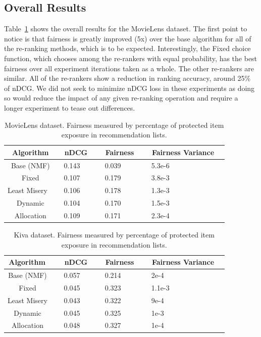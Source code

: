 \subsection{Overall Results}

Table~\ref{tab:overall-ML} shows the overall results for the MovieLens dataset. The first point to notice is that fairness is greatly improved (5x) over the base algorithm for all of the re-ranking methods, which is to be expected. Interestingly, the Fixed choice function, which chooses among the re-rankers with equal probability, has the best fairness over all experiment iterations taken as a whole. The other re-rankers are similar. All of the re-rankers show a reduction in ranking accuracy, around 25\% of nDCG. We did not seek to minimize nDCG loss in these experiments as doing so would reduce the impact of any given re-ranking operation and require a longer experiment to tease out differences.

\begin{table}[htb]
    \centering
    \begin{tabular}{c|l|l|l}
       Algorithm  & \ nDCG \ & \ Fairness \  & \ Fairness Variance \ \\
       \hline
       Base (NMF)       & \ 0.143 & \ 0.039 & \ 5.3e-6 \  \\
       Fixed            & \ 0.107 & \ 0.179 & \ 3.8e-3 \ \\
       Least Misery \   & \ 0.106 & \ 0.178 & \ 1.3e-3 \ \\
       Dynamic          & \ 0.104 & \ 0.170 & \ 1.5e-3 \ \\
       Allocation       & \ 0.109 & \ 0.171 & \ 2.3e-4 \ \\
    \end{tabular}
    \caption{MovieLens dataset. Fairness measured by percentage of protected item exposure in recommendation lists.}
    \label{tab:overall-ML}
\end{table}


\begin{table}[htb]
    \centering
    \begin{tabular}{c|l|l|l}
       Algorithm  \ & \ nDCG \ & \ Fairness \ & \ Fairness Variance \ \\
       \hline
       Base (NMF)   \ & \ 0.057 & \ 0.214 & \ 2e-4\\
       Fixed        \ & \ 0.045 & \ 0.323 & \ 1.1e-3\\
       Least Misery \ & \ 0.043 & \ 0.322 & \ 9e-4\\
       Dynamic      \ & \ 0.045 & \ 0.325 & \ 1e-3\\
       Allocation   \ & \ 0.048 & \ 0.327 & \ 1e-4\\
    \end{tabular}
    \caption{Kiva dataset. Fairness measured by percentage of protected item exposure in recommendation lists.}
    \label{tab:overall-Kiva}
\end{table}



